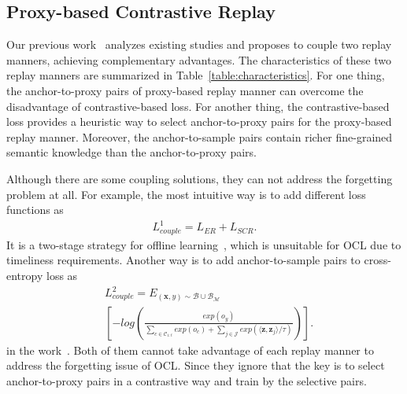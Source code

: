 
\subsection{Proxy-based Contrastive Replay}
\label{sec:PCR}

Our previous work~\cite{Lin_2023_CVPR} analyzes existing studies and proposes to couple two replay manners, achieving complementary advantages. The characteristics of these two replay manners are summarized in Table~\ref{table:characteristics}. For one thing, the anchor-to-proxy pairs of proxy-based replay manner can overcome the disadvantage of contrastive-based loss. For another thing, the contrastive-based loss provides a heuristic way to select anchor-to-proxy pairs for the proxy-based replay manner. Moreover, the anchor-to-sample pairs contain richer fine-grained semantic knowledge than the anchor-to-proxy pairs.

Although there are some coupling solutions, they can not address the forgetting problem at all. For example, the most intuitive way is to add different loss functions as
\begin{equation}
\begin{split}
    \label{eq:coupleloss1}
    L_{couple}^{1}=L_{ER} + L_{SCR}.
\end{split}
\end{equation} 
It is a two-stage strategy for offline learning~\cite{li2022targeted}, which is unsuitable for OCL due to timeliness requirements. Another way is to add anchor-to-sample pairs to cross-entropy loss as
\begin{equation}
\begin{split}
    \label{eq:coupleloss2}
    &
    L_{couple}^{2}=E_{(\bm{x},y)\sim{\mathcal{B}\cup\mathcal{B}_\mathcal{M}}}\\
    &
    [-log(\frac{exp(o_y)}{\sum_{c\in{\mathcal{C}_{1:t}}}exp(o_c)+\sum_{j\in{\mathcal{J}}}exp(\langle \bm{z},\bm{z}_j\rangle/\tau)})].
\end{split}
\end{equation} 
in the work~\cite{yao2022pcl}. Both of them cannot take advantage of each replay manner to address the forgetting issue of OCL. Since they ignore that the key is to select anchor-to-proxy pairs in a contrastive way and train by the selective pairs. 


